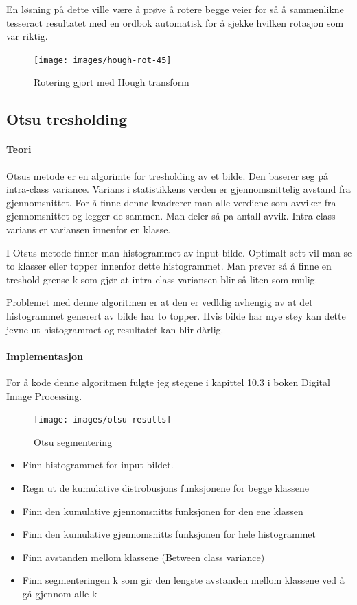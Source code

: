 \documentclass{article}
\begin{document}
En løsning på dette ville være å prøve å rotere begge veier for så å sammenlikne tesseract resultatet med en ordbok automatisk for å sjekke hvilken rotasjon som var riktig.



\begin{figure}[h]
\centering
\texttt{[image: images/hough-rot-45]}
\caption{Rotering gjort med Hough transform}
\label{fig:hough-45}
\end{figure}


\subsection{Otsu tresholding}
\paragraph{Teori}
Otsus metode er en algorimte for tresholding av et bilde. Den baserer seg på intra-class variance. Varians i statistikkens verden er gjennomsnittelig avstand fra gjennomsnittet.
For å finne denne kvadrerer man alle verdiene som avviker fra gjennomsnittet og legger de sammen. Man deler så pa antall avvik. Intra-class varians er variansen innenfor en klasse.

I Otsus metode finner man histogrammet av input bilde. Optimalt sett vil man se to klasser eller topper innenfor dette histogrammet. Man prøver så å finne en treshold grense k som gjør at intra-class variansen blir så liten som mulig.

Problemet med denne algoritmen er at den er vedldig avhengig av at det histogrammet generert av bilde har to topper. Hvis bilde har mye støy kan dette jevne ut histogrammet og resultatet kan blir dårlig.

\paragraph{Implementasjon}
For å kode denne algoritmen fulgte jeg stegene i kapittel 10.3 i boken Digital Image Processing.

\begin{figure}[h]
\centering
\texttt{[image: images/otsu-results]}
\caption{Otsu segmentering}
\label{fig:otsu-results}
\end{figure}


\begin{itemize}
\item Finn histogrammet for input bildet.
\item Regn ut de kumulative distrobusjons funksjonene for begge klassene
\item Finn den kumulative gjennomsnitts funksjonen for den ene klassen
\item Finn den kumulative gjennomsnitts funksjonen for hele histogrammet
\item Finn avstanden mellom klassene (Between class variance)
\item Finn segmenteringen k som gir den lengste avstanden mellom klassene ved å gå gjennom alle k
\end{itemize}
\end{document}
